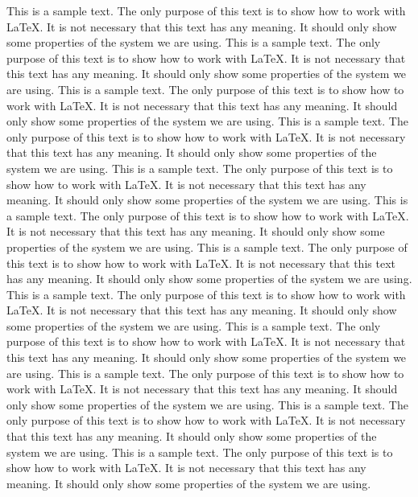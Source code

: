 \documentclass[10pt, paper=a4, abstracton]{scrartcl}
\begin{document}
This is a sample text. The only purpose of this text is to show how to work with \LaTeX . It is not necessary that this text has any meaning. It should only show some properties of the system we are using. This is a sample text. The only purpose of this text is to show how to work with \LaTeX . It is not necessary that this text has any meaning. It should only show some properties of the system we are using. This is a sample text. The only purpose of this text is to show how to work with \LaTeX . It is not necessary that this text has any meaning. It should only show some properties of the system we are using. This is a sample text. The only purpose of this text is to show how to work with \LaTeX . It is not necessary that this text has any meaning. It should only show some properties of the system we are using. This is a sample text. The only purpose of this text is to show how to work with \LaTeX . It is not necessary that this text has any meaning. It should only show some properties of the system we are using. This is a sample text. The only purpose of this text is to show how to work with \LaTeX . It is not necessary that this text has any meaning. It should only show some properties of the system we are using. This is a sample text. The only purpose of this text is to show how to work with \LaTeX . It is not necessary that this text has any meaning. It should only show some properties of the system we are using. This is a sample text. The only purpose of this text is to show how to work with \LaTeX . It is not necessary that this text has any meaning. It should only show some properties of the system we are using. This is a sample text. The only purpose of this text is to show how to work with \LaTeX . It is not necessary that this text has any meaning. It should only show some properties of the system we are using. This is a sample text. The only purpose of this text is to show how to work with \LaTeX . It is not necessary that this text has any meaning. It should only show some properties of the system we are using. This is a sample text. The only purpose of this text is to show how to work with \LaTeX . It is not necessary that this text has any meaning. It should only show some properties of the system we are using. This is a sample text. The only purpose of this text is to show how to work with \LaTeX . It is not necessary that this text has any meaning. It should only show some properties of the system we are using. 
\end{document}
